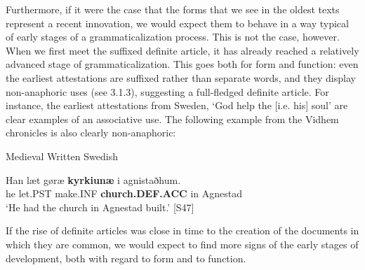 Furthermore, if it were the case that the forms that we see in the oldest texts represent a recent innovation, we would expect them to behave in a way typical of early stages of a grammaticalization process. This is not the case, however. When we first meet the suffixed definite article, it has already reached a relatively advanced stage of grammaticalization. This goes both for form and function: even the earliest attestations are suffixed rather than separate words, and they display non-anaphoric uses (see 3.1.3), suggesting a full-fledged definite article. For instance, the earliest attestations from Sweden, ‘God help the [i.e. his] soul’ are clear examples of an associative use. The following example from the Vidhem chronicles is also clearly non-anaphoric:


\item 

Medieval Written Swedish 



 \ea\label{}
\gll Han  læt  gøræ  \textbf{kyrkiunæ} i  agnistaðhum.\\


he  let.PST  make.INF  \textbf{church.DEF.ACC} in  Agnestad\\

\glt ‘He had the church in Agnestad built.’ [S47]

\z

If the rise of definite articles was close in time to the creation of the documents in which they are common, we would expect to find more signs of the early stages of development, both with regard to form and to function.


